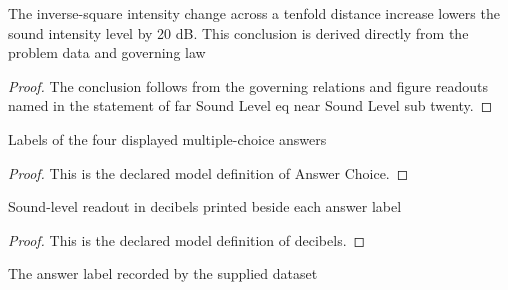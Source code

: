 \begin{lemma}
  \label{lem:physics:phyx-mini-0212:phyxminiproblems-problemphyxmini0212-farsoundlevel-eq-nearsoundlevel-sub-twenty}
  The inverse-square intensity change across a tenfold distance increase lowers the sound intensity level by 20 dB. This conclusion is derived directly from the problem data and governing law
\end{lemma}
\begin{proof}
  The conclusion follows from the governing relations and figure readouts named in the statement of far Sound Level eq near Sound Level sub twenty.
\end{proof}
\begin{definition}
  \label{def:physics:phyx-mini-0212:phyxminiproblems-problemphyxmini0212-answerchoice}
  Labels of the four displayed multiple-choice answers
\end{definition}
\begin{proof}
  This is the declared model definition of Answer Choice.
\end{proof}
\begin{definition}[decibels]
  \label{def:physics:phyx-mini-0212:phyxminiproblems-problemphyxmini0212-answerchoice-decibels}
  Sound-level readout in decibels printed beside each answer label
\end{definition}
\begin{proof}
  This is the declared model definition of decibels.
\end{proof}
\begin{definition}
  \label{def:physics:phyx-mini-0212:phyxminiproblems-problemphyxmini0212-recordedanswerchoice}
  The answer label recorded by the supplied dataset
\end{definition}
